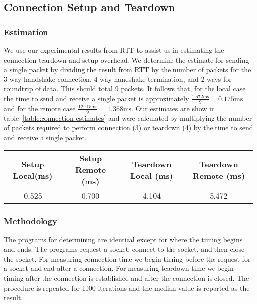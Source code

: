 \subsection{Connection Setup and Teardown}

\subsubsection{Estimation}
We use our experimental results from RTT to assist us in estimating the connection teardown and setup
overhead. We determine the estimate for sending a single packet by dividing the result from RTT by the number of packets for the 3-way handshake connection, 4-way handshake termination, and 2-ways for roundtrip of data. This should total 9 packets. It follows that, for the local case the time to send and receive a single packet is approximately $\frac{1.572\text{ms}}{9} = 0.175\text{ms}$ and for the remote case $\frac{12.315\text{ms}}{9} = 1.368\text{ms}$. Our estimates are show in table~\ref{table:connection-estimates} and were calculated by multiplying the number of packets required to perform connection (3) or teardown (4) by the time to send and receive a single packet.

\begin{table*}[b]
\begin{tabular}{|c|c|c|c|}
\hline
Setup Local(ms) & Setup Remote (ms) & Teardown Local (ms) & Teardown Remote (ms)\\ \hline
0.525            & 0.700          & 4.104            & 5.472          \\ \hline
\end{tabular}
\caption{Estimates for TCP connection setup and teardown overhead}
\label{table:connection-estimates}
\end{table*}

\subsubsection{Methodology}
The programs for determining are identical except for where the timing begins and ends. The programs 
request a socket, connect to the socket, and then close the socket. For measuring connection time we
begin timing before the request for a socket and end after a connection.  For measuring teardown time
 we begin timing after the connection is established and after the connection is closed. The 
 procedure is repeated for 1000 iterations and the median value is reported as the result.

